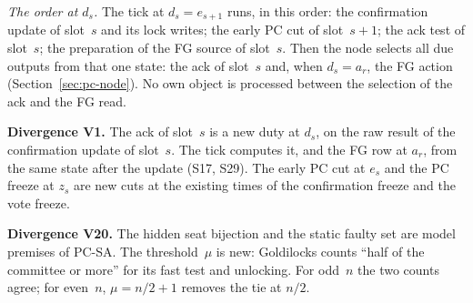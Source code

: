 \documentclass{article}
\newcommand{\PCdiv}[2]{\par\noindent\textbf{Divergence #1.} #2\par}
\begin{document}
\emph{The order at $d_s$.}  The tick at $d_s=e_{s+1}$ runs, in this order:
the confirmation update of slot~$s$ and its lock writes; the early PC cut
of slot~$s+1$; the ack test of slot~$s$; the preparation of the FG source
of slot~$s$.  Then the node selects all due outputs from that one state:
the ack of slot~$s$ and, when $d_s=a_r$, the FG action
(Section~\ref{sec:pc-node}).  No own object is processed between the
selection of the ack and the FG read.

\PCdiv{V1}{The ack of slot~$s$ is a new duty at $d_s$, on the raw result
of the confirmation update of slot~$s$.  The tick computes it, and the FG
row at $a_r$, from the same state after the update (S17, S29).  The early
PC cut at $e_s$ and the PC freeze at $z_s$ are new cuts at the existing
times of the confirmation freeze and the vote freeze.}

\PCdiv{V20}{The hidden seat bijection and the static faulty set are
model premises of PC-SA.  The threshold~$\mu$ is new: Goldilocks counts
``half of the committee or more'' for its fast test and unlocking.  For
odd~$n$ the two counts agree; for even~$n$, $\mu=n/2+1$ removes the tie at
$n/2$.}
\end{document}
